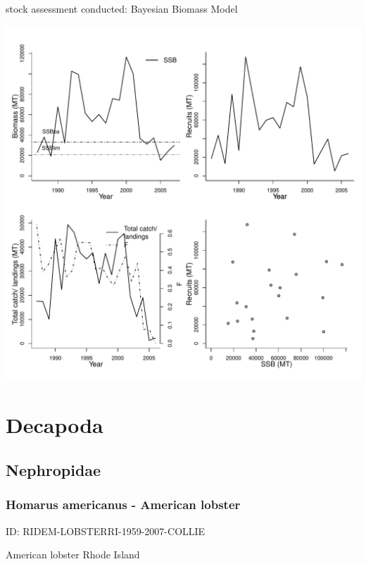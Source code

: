 stock assessment conducted: Bayesian Biomass Model 
\begin{center}
\vspace{-0.2cm}\includegraphics[scale=0.65]{../tex/figures/plot-WGMHSA-ANCHOBAYB-1986-2007-JENNINGS.pdf}
\end{center}

\newpage
\section{Decapoda}

\subsection{Nephropidae}

\subsubsection{Homarus americanus - American lobster}
ID: RIDEM-LOBSTERRI-1959-2007-COLLIE

American lobster Rhode Island 

